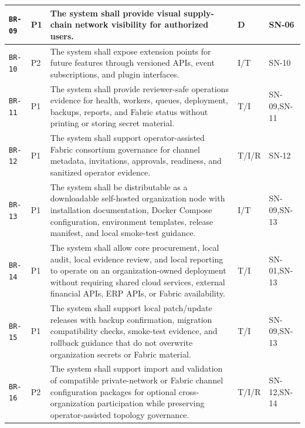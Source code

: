 \documentclass[11pt,a4paper]{article}
\begin{document}
\begin{footnotesize}
\begin{longtable}{@{}p{}p{}p{}p{}p{}@{}}
\texttt{BR-09} & P1 & The system shall provide visual supply-chain network visibility for authorized users. & D & SN-06 \\ \hline
\texttt{BR-10} & P2 & The system shall expose extension points for future features through versioned APIs, event subscriptions, and plugin interfaces. & I/T & SN-10 \\ \hline
\texttt{BR-11} & P1 & The system shall provide reviewer-safe operations evidence for health, workers, queues, deployment, backups, reports, and Fabric status without printing or storing secret material. & T/I & SN-09,SN-11 \\ \hline
\texttt{BR-12} & P1 & The system shall support operator-assisted Fabric consortium governance for channel metadata, invitations, approvals, readiness, and sanitized operator evidence. & T/I/R & SN-12 \\ \hline
\texttt{BR-13} & P1 & The system shall be distributable as a downloadable self-hosted organization node with installation documentation, Docker Compose configuration, environment templates, release manifest, and local smoke-test guidance. & I/T & SN-09,SN-13 \\ \hline
\texttt{BR-14} & P1 & The system shall allow core procurement, local audit, local evidence review, and local reporting to operate on an organization-owned deployment without requiring shared cloud services, external financial APIs, ERP APIs, or Fabric availability. & T/I & SN-01,SN-13 \\ \hline
\texttt{BR-15} & P1 & The system shall support local patch/update releases with backup confirmation, migration compatibility checks, smoke-test evidence, and rollback guidance that do not overwrite organization secrets or Fabric material. & T/I & SN-09,SN-13 \\ \hline
\texttt{BR-16} & P2 & The system shall support import and validation of compatible private-network or Fabric channel configuration packages for optional cross-organization participation while preserving operator-assisted topology governance. & T/I/R & SN-12,SN-14 \\ \hline
\end{longtable}
\end{footnotesize}
\end{document}
